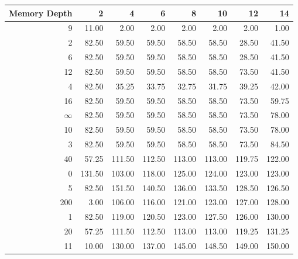 \begin{tabular}{rrrrrrrr}
\toprule
 Memory Depth &       2 &       4 &       6 &       8 &      10 &      12 &      14 \\
\midrule
            9 &   11.00 &    2.00 &    2.00 &    2.00 &    2.00 &    2.00 &    1.00 \\
            2 &   82.50 &   59.50 &   59.50 &   58.50 &   58.50 &   28.50 &   41.50 \\
            6 &   82.50 &   59.50 &   59.50 &   58.50 &   58.50 &   28.50 &   41.50 \\
           12 &   82.50 &   59.50 &   59.50 &   58.50 &   58.50 &   73.50 &   41.50 \\
            4 &   82.50 &   35.25 &   33.75 &   32.75 &   31.75 &   39.25 &   42.00 \\
           16 &   82.50 &   59.50 &   59.50 &   58.50 &   58.50 &   73.50 &   59.75 \\
           $\infty$ &   82.50 &   59.50 &   59.50 &   58.50 &   58.50 &   73.50 &   78.00 \\
           10 &   82.50 &   59.50 &   59.50 &   58.50 &   58.50 &   73.50 &   78.00 \\
            3 &   82.50 &   59.50 &   59.50 &   58.50 &   58.50 &   73.50 &   84.50 \\
           40 &   57.25 &  111.50 &  112.50 &  113.00 &  113.00 &  119.75 &  122.00 \\
            0 &  131.50 &  103.00 &  118.00 &  125.00 &  124.00 &  123.00 &  123.00 \\
            5 &   82.50 &  151.50 &  140.50 &  136.00 &  133.50 &  128.50 &  126.50 \\
          200 &    3.00 &  106.00 &  116.00 &  121.00 &  123.00 &  127.00 &  128.00 \\
            1 &   82.50 &  119.00 &  120.50 &  123.00 &  127.50 &  126.00 &  130.00 \\
           20 &   57.25 &  111.50 &  112.50 &  113.00 &  113.00 &  119.25 &  131.25 \\
           11 &   10.00 &  130.00 &  137.00 &  145.00 &  148.50 &  149.00 &  150.00 \\
\bottomrule
\end{tabular}
